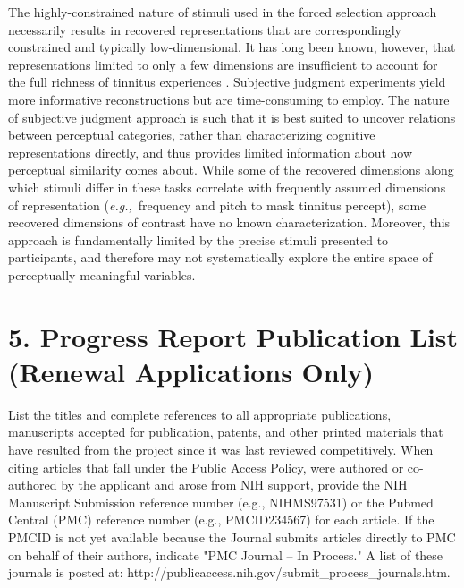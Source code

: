 \documentclass[11pt, notitlepage]{article} %
\def\eg{{\emph{e.g.,}}~}
\begin{document}
The highly-constrained nature of stimuli used in the forced selection approach necessarily results
in recovered representations that are correspondingly constrained and typically low-dimensional. It has
long been known, however, that representations limited to only a few dimensions are insufficient to
account for the full richness of tinnitus experiences
\cite{vajsakovicPrinciplesMethodsPsychoacoustic2021}.
Subjective judgment experiments yield more informative reconstructions but are time-consuming to employ.
The nature of subjective judgment
approach is such that it is best suited to uncover relations between perceptual categories, rather than
characterizing cognitive representations directly, and thus provides limited information about how
perceptual similarity comes about. While some of the recovered dimensions along which stimuli differ in
these tasks correlate with frequently assumed dimensions of representation (\eg frequency and pitch to mask tinnitus percept),
some recovered dimensions of contrast have no known characterization.
Moreover, this approach is fundamentally limited by the precise stimuli presented to participants, and
therefore may not systematically explore the entire space of perceptually-meaningful variables.




\newpage

\section*{5. Progress Report Publication List (Renewal Applications Only)}

List the titles and complete references to all appropriate publications, manuscripts accepted for publication, patents, and other printed materials that have resulted from the project since it was last reviewed competitively. When citing articles that fall under the Public Access Policy, were authored or co-authored by the applicant and arose from NIH support, provide the NIH Manuscript Submission reference number (e.g., NIHMS97531) or the Pubmed Central (PMC) reference number (e.g., PMCID234567) for each article. If the PMCID is not yet available because the Journal submits articles directly to PMC on behalf of their authors, indicate "PMC Journal -- In Process." A list of these journals is posted at: http://publicaccess.nih.gov/submit\_process\_journals.htm.
\end{document}
